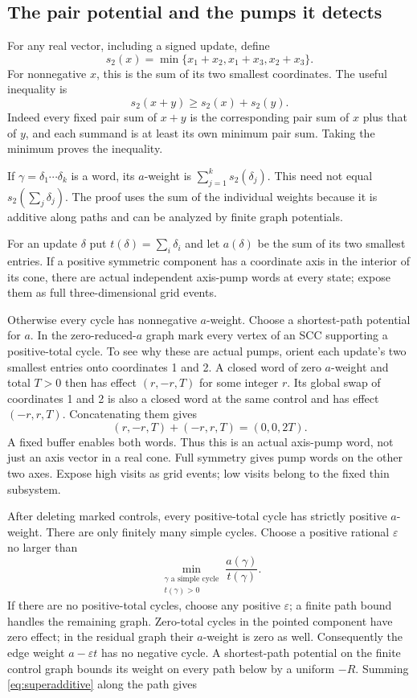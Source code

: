 \documentclass[11pt,a4paper]{article}
\theoremstyle{remark}
\begin{document}
\subsection{The pair potential and the pumps it detects}

For any real vector, including a signed update, define
\[
 s_2(x)=\min\{x_1+x_2,x_1+x_3,x_2+x_3\}.
\]
For nonnegative \(x\), this is the sum of its two smallest coordinates.
The useful inequality is
\begin{equation}
 s_2(x+y)\ge s_2(x)+s_2(y).\label{eq:superadditive}
\end{equation}
Indeed every fixed pair sum of \(x+y\) is the corresponding pair sum
of \(x\) plus that of \(y\), and each summand is at least its own
minimum pair sum. Taking the minimum proves the inequality.

If \(\gamma=\delta_1\cdots\delta_k\) is a word, its \(a\)-weight is
\(\sum_{j=1}^k s_2(\delta_j)\). This need not equal
\(s_2(\sum_j\delta_j)\). The proof uses the sum of the individual
weights because it is additive along paths and can be analyzed by
finite graph potentials.

For an update \(\delta\) put \(t(\delta)=\sum_i\delta_i\) and let \(a(\delta)\) be the sum of its two smallest entries. If a positive symmetric component has a coordinate axis in the interior of its cone, there are actual independent axis-pump words at every state; expose them as full three-dimensional grid events.

Otherwise every cycle has nonnegative \(a\)-weight. Choose a shortest-path potential for \(a\). In the zero-reduced-\(a\) graph mark every vertex of an SCC supporting a positive-total cycle. To see why these are actual pumps, orient each update's two
smallest entries onto coordinates 1 and 2. A closed word of zero
\(a\)-weight and total \(T>0\) then has effect
\((r,-r,T)\) for some integer \(r\). Its global swap of coordinates
1 and 2 is also a closed word at the same control and has effect
\((-r,r,T)\). Concatenating them gives
\[
 (r,-r,T)+(-r,r,T)=(0,0,2T).
\]
A fixed buffer enables both words. Thus this is an actual axis-pump
word, not just an axis vector in a real cone. Full symmetry gives
pump words on the other two axes. Expose high visits as grid events; low visits belong to the fixed thin subsystem.

After deleting marked controls, every positive-total cycle has
strictly positive \(a\)-weight. There are only finitely many simple
cycles. Choose a positive rational \(\varepsilon\) no larger than
\begin{equation}
 \min_{\substack{\gamma\text{ a simple cycle}\\t(\gamma)>0}}
      \frac{a(\gamma)}{t(\gamma)}.\label{eq:epsilon}
\end{equation}
If there are no positive-total cycles, choose any positive
\(\varepsilon\); a finite path bound handles the remaining graph.
Zero-total cycles in the pointed component have zero effect; in the
residual graph their \(a\)-weight is zero as well. Consequently the
edge weight \(a-\varepsilon t\) has no negative cycle. A shortest-path
potential on the finite control graph bounds its weight on every path
below by a uniform \(-R\). Summing
\eqref{eq:superadditive} along the path gives
\end{document}
